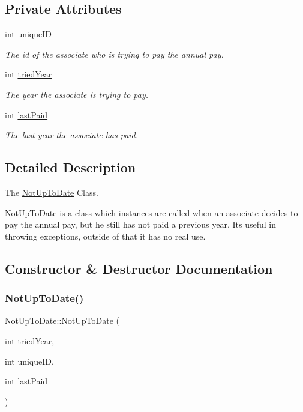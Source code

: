 \subsection*{Private Attributes}
\begin{DoxyCompactItemize}
\item 
int \hyperlink{classNotUpToDate_afa612d29a846c1e7b679fbb069035a72}{unique\+ID}
\begin{DoxyCompactList}\small\item\em The id of the associate who is trying to pay the annual pay. \end{DoxyCompactList}\item 
int \hyperlink{classNotUpToDate_a5e44159542e23d8ad12aba8768bd3350}{tried\+Year}
\begin{DoxyCompactList}\small\item\em The year the associate is trying to pay. \end{DoxyCompactList}\item 
int \hyperlink{classNotUpToDate_a728feda5151336575cd80a9b52a7a7d3}{last\+Paid}
\begin{DoxyCompactList}\small\item\em The last year the associate has paid. \end{DoxyCompactList}\end{DoxyCompactItemize}


\subsection{Detailed Description}
The \hyperlink{classNotUpToDate}{Not\+Up\+To\+Date} Class. 

\hyperlink{classNotUpToDate}{Not\+Up\+To\+Date} is a class which instances are called when an associate decides to pay the annual pay, but he still has not paid a previous year. Its useful in throwing exceptions, outside of that it has no real use. 

\subsection{Constructor \& Destructor Documentation}
\mbox{\label{classNotUpToDate_a61d903e6816ad8d5f5b496a72047df45}} 
\subsubsection{\texorpdfstring{Not\+Up\+To\+Date()}{NotUpToDate()}}
{\footnotesize\ttfamily Not\+Up\+To\+Date\+::\+Not\+Up\+To\+Date (\begin{DoxyParamCaption}\item[{int}]{tried\+Year,  }\item[{int}]{unique\+ID,  }\item[{int}]{last\+Paid }\end{DoxyParamCaption})\hspace{0.3cm}{\ttfamily [inline]}}



